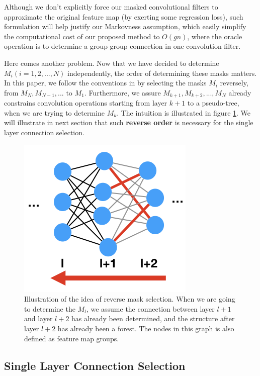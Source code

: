 \documentclass{acmtog} %
\begin{document}
Although we don't explicitly force our masked convolutional filters to approximate the original feature map (by exerting some regression loss), such formulation will help justify our Markovness assumption, which easily simplify the computational cost of our proposed method to $O(gn)$, where the oracle operation is to determine a group-group connection in one convolution filter.

Here comes another problem. Now that we have decided to determine $M_i(i=1,2,...,N)$ independently, the order of determining these masks matters. In this paper, we follow the conventions in \cite{GNAS} by selecting the masks $M_i$ reversely, from $M_N, M_{N-1}, ...$ to $M_1$. Furthermore, we assure $M_{k+1}, M_{k+2}, ..., M_{N}$ already constrains convolution operations starting from layer $k+1$ to a pseudo-tree, when we are trying to determine $M_k$. The intuition is illustrated in figure \ref{fig:method1}. We will illustrate in next section that such \textbf{reverse order} is necessary for the single layer connection selection.

\begin{figure}
\centering
\includegraphics[width=0.5\linewidth]{assets/method1.png}
\caption{Illustration of the idea of reverse mask selection. When we are going to determine the $M_l$, we assume the connection between layer $l+1$ and layer $l+2$ has already been determined, and the structure after layer $l+2$ has already been a forest. The nodes in this graph is also defined as feature map groups.}
\label{fig:method1}
\end{figure}

\subsection{Single Layer Connection Selection}
\end{document}

